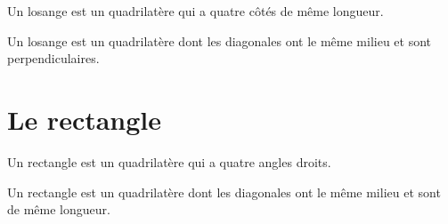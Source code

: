 \documentclass[a4paper,10pt]{report}
\begin{document}
\begin{minipage}{11cm}
\begin{defn}
Un losange est un quadrilatère qui a quatre côtés de même longueur. 
\end{defn}
\medskip

\begin{prop}
Un losange est un quadrilatère dont les diagonales ont le même milieu et sont perpendiculaires.
\end{prop}
\end{minipage}

\section{Le rectangle}

\begin{minipage}{11cm}
\begin{defn}
Un rectangle est un quadrilatère qui a quatre angles droits.
\end{defn}
\medskip

\begin{prop}
Un rectangle est un quadrilatère dont les diagonales ont le même milieu et sont de même longueur.
\end{prop}
\end{minipage}
\end{document}

